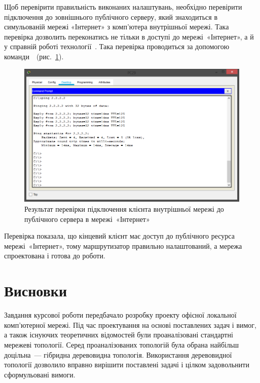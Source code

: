 \documentclass[
  ukrainian,
  simple,
  floatsection,
]{eskdnaukvd}
\newlength{\gridunitwidth}
\begin{document}
      Щоб перевірити правильність виконаних налаштувань, необхідно перевірити підключення до зовнішнього публічного серверу, який знаходиться в симульованій мережі «Інтернет» з комп'ютера внутрішньої мережі. Така перевірка дозволить переконатись не тільки в доступі до мережі~«Інтернет», а й у справній роботі технології~\textenglish{}. Така перевірка проводиться за допомогою команди~~(рис.~\ref{fig:router-ping}).

      \begin{figure}[!htbp]
        \centering
        \includegraphics[width = 8 \gridunitwidth]{./assets/12-router-ping.png}
        \caption{Результат перевірки підключення клієнта внутрішньої мережі до публічного сервера в мережі~«Інтернет»}
        \label{fig:router-ping}
      \end{figure}

      Перевірка показала, що кінцевий клієнт має доступ до публічного ресурса мережі~«Інтернет», тому маршрутизатор правильно налаштований, а мережа спроектована і готова до роботи.

  \section*{Висновки}
    Завдання курсової роботи передбачало розробку проекту офісної локальної комп'ютерної мережі. Під час проектування на основі поставлених задач і вимог, а також існуючих теоретичних відомостей були проаналізовані стандартні мережеві топології. Серед проаналізованих топологій була обрана найбільш доцільна~— гібридна деревовидна топологія. Використання деревовидної топології дозволило вправно вирішити поставлені задачі і цілком задовольнити сформульовані вимоги.
\end{document}

